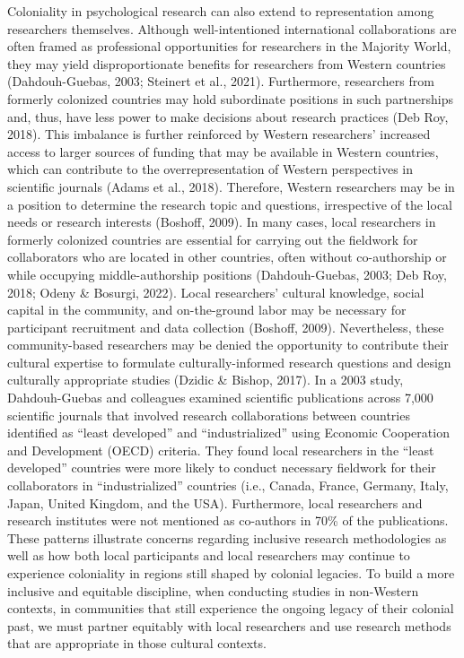 \documentclass[
  11pt,
]{book}
\begin{document}
Coloniality in psychological research can also extend to representation among researchers themselves. Although well-intentioned international collaborations are often framed as professional opportunities for researchers in the Majority World, they may yield disproportionate benefits for researchers from Western countries (Dahdouh-Guebas, 2003; Steinert et al., 2021). Furthermore, researchers from formerly colonized countries may hold subordinate positions in such partnerships and, thus, have less power to make decisions about research practices (Deb Roy, 2018). This imbalance is further reinforced by Western researchers' increased access to larger sources of funding that may be available in Western countries, which can contribute to the overrepresentation of Western perspectives in scientific journals (Adams et al., 2018). Therefore, Western researchers may be in a position to determine the research topic and questions, irrespective of the local needs or research interests (Boshoff, 2009). In many cases, local researchers in formerly colonized countries are essential for carrying out the fieldwork for collaborators who are located in other countries, often without co-authorship or while occupying middle-authorship positions (Dahdouh-Guebas, 2003; Deb Roy, 2018; Odeny \& Bosurgi, 2022). Local researchers' cultural knowledge, social capital in the community, and on-the-ground labor may be necessary for participant recruitment and data collection (Boshoff, 2009). Nevertheless, these community-based researchers may be denied the opportunity to contribute their cultural expertise to formulate culturally-informed research questions and design culturally appropriate studies (Dzidic \& Bishop, 2017). In a 2003 study, Dahdouh-Guebas and colleagues examined scientific publications across 7,000 scientific journals that involved research collaborations between countries identified as ``least developed'' and ``industrialized'' using Economic Cooperation and Development (OECD) criteria. They found local researchers in the ``least developed'' countries were more likely to conduct necessary fieldwork for their collaborators in ``industrialized'' countries (i.e., Canada, France, Germany, Italy, Japan, United Kingdom, and the USA). Furthermore, local researchers and research institutes were not mentioned as co-authors in 70\% of the publications. These patterns illustrate concerns regarding inclusive research methodologies as well as how both local participants and local researchers may continue to experience coloniality in regions still shaped by colonial legacies. To build a more inclusive and equitable discipline, when conducting studies in non-Western contexts, in communities that still experience the ongoing legacy of their colonial past, we must partner equitably with local researchers and use research methods that are appropriate in those cultural contexts.
\end{document}
